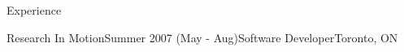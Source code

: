 \documentclass{resume}
\begin{document}
\begin{rSection}{Experience}
\begin{rSubsection}{Research In Motion}{Summer 2007 (May - Aug)}{Software Developer}{Toronto, ON}
      \begin{comment}
        \item Designed a prototype and implemented a web application to access administrative settings on a server using SOAP-based HTTP communication
        \item Debugged existing code and tested new code, ensuring the code will work in the future and save the company time and money having to deal with broken code later on
        \item Distributed a new version of a tool for use by multiple teams ensuring everyone involved was using and familiarizing themselves with the latest tools
        \item Provided technical support to product’s users, freeing them up from having to spend time figuring out what they had trouble with and allowing them to spend the time productively
        \item Wrote user friendly instructions on use of the new application, allowing the application to enter use quicker than it otherwise would have taken 
        \item Reported weekly on application status to two development groups, helping them keep on schedule
      \end{comment}
    \end{rSubsection}

  \end{rSection}
\end{document}
